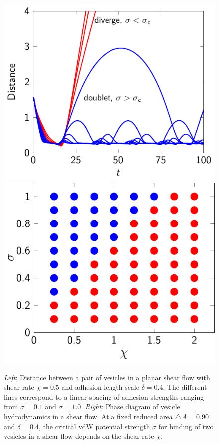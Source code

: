 \documentclass[aps,prl,twocolumn,showpacs,amsmath,amssymb]{revtex4-1}
\begin{document}
\begin{figure}
  \includegraphics[height=0.4\textwidth]{figs/shear_adR4em1Chi1e0_ra-090.pdf}
  \includegraphics[height=0.4\textwidth]{figs/shear_adR4em1_ra090_phaseDiagram.pdf}
  \caption{{\em Left}: Distance between a pair of vesicles in a planar
    shear flow with shear rate $\chi=0.5$ and adhesion length scale
    $\delta = 0.4$.   The different lines correspond to a linear spacing
    of adhesion strengths ranging from $\sigma=0.1$ and $\sigma=1.0$.
    {\em Right}: Phase diagram of vesicle hydrodynamics in a shear flow.
    At a fixed reduced area $\triangle A=0.90$ and $\delta =0.4$,  the
    critical vdW potential strength $\sigma$ for binding of two vesicles
  in a shear flow depends on the shear rate $\chi$.
\label{fig:sflow_phase_diagram}}
\end{figure}

\end{document}
